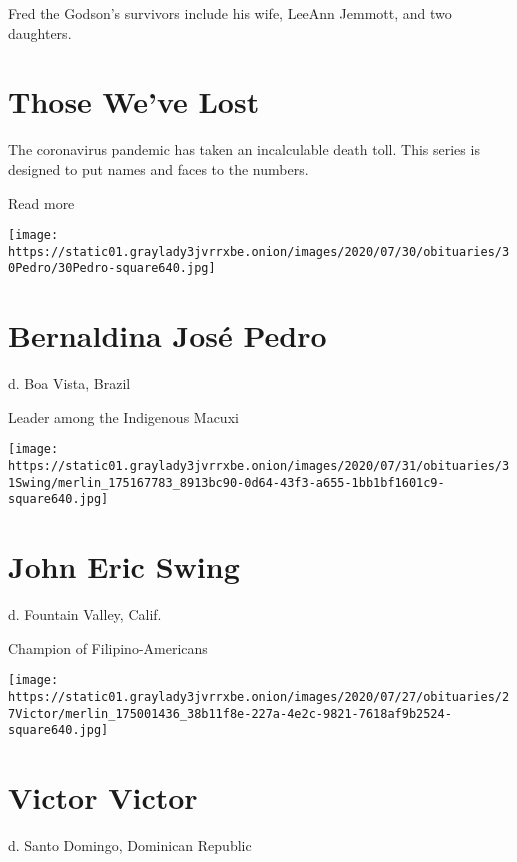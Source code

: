 Fred the Godson's survivors include his wife, LeeAnn Jemmott, and two
daughters.

\href{https://www.nytimes3xbfgragh.onion/interactive/2020/obituaries/people-died-coronavirus-obituaries.html?action=click\&pgtype=Article\&state=default\&region=BELOW_MAIN_CONTENT\&context=covid_obits_promo}{}

\hypertarget{those-weve-lost}{%
\section{Those We've Lost}\label{those-weve-lost}}

The coronavirus pandemic has taken an incalculable death toll. This
series is designed to put names and faces to the numbers.

Read more

\texttt{[image: https://static01.graylady3jvrrxbe.onion/images/2020/07/30/obituaries/30Pedro/30Pedro-square640.jpg]}

\hypertarget{bernaldina-josuxe9-pedro}{%
\section{Bernaldina José Pedro}\label{bernaldina-josuxe9-pedro}}

d. Boa Vista, Brazil

Leader among the Indigenous Macuxi

\texttt{[image: https://static01.graylady3jvrrxbe.onion/images/2020/07/31/obituaries/31Swing/merlin\_175167783\_8913bc90-0d64-43f3-a655-1bb1bf1601c9-square640.jpg]}

\hypertarget{john-eric-swing}{%
\section{John Eric Swing}\label{john-eric-swing}}

d. Fountain Valley, Calif.

Champion of Filipino-Americans

\texttt{[image: https://static01.graylady3jvrrxbe.onion/images/2020/07/27/obituaries/27Victor/merlin\_175001436\_38b11f8e-227a-4e2c-9821-7618af9b2524-square640.jpg]}

\hypertarget{victor-victor}{%
\section{Victor Victor}\label{victor-victor}}

d. Santo Domingo, Dominican Republic

